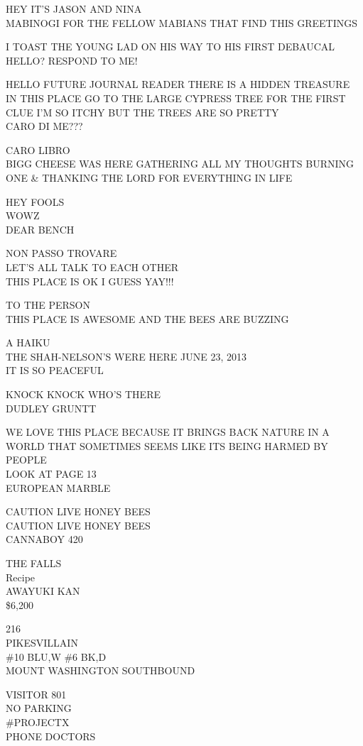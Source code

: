 \documentclass[10pt,letterpaper]{article}
\begin{document}
HEY IT'S JASON AND NINA\\
MABINOGI FOR THE FELLOW MABIANS THAT FIND THIS GREETINGS

I TOAST THE YOUNG LAD ON HIS WAY TO HIS FIRST DEBAUCAL\\
HELLO?  RESPOND TO ME!

HELLO FUTURE JOURNAL READER THERE IS A HIDDEN TREASURE IN THIS PLACE GO TO THE LARGE CYPRESS TREE FOR THE FIRST CLUE I'M SO ITCHY BUT THE TREES ARE SO PRETTY\\
CARO DI ME???

CARO LIBRO\\
BIGG CHEESE WAS HERE GATHERING ALL MY THOUGHTS BURNING ONE \& THANKING THE LORD FOR EVERYTHING IN LIFE

HEY FOOLS\\
WOWZ\\
DEAR BENCH

NON PASSO TROVARE\\
LET'S ALL TALK TO EACH OTHER\\
THIS PLACE IS OK I GUESS YAY!!!

TO THE PERSON\\
THIS PLACE IS AWESOME AND THE BEES ARE BUZZING

A HAIKU\\
THE SHAH{-}NELSON'S WERE HERE JUNE 23, 2013\\
IT IS SO PEACEFUL

KNOCK KNOCK WHO'S THERE\\
DUDLEY GRUNTT

WE LOVE THIS PLACE BECAUSE IT BRINGS BACK NATURE IN A WORLD THAT SOMETIMES SEEMS LIKE ITS BEING HARMED BY PEOPLE\\
LOOK AT PAGE 13\\
EUROPEAN MARBLE

CAUTION LIVE HONEY BEES\\
CAUTION LIVE HONEY BEES\\
CANNABOY 420

THE FALLS\\
Recipe\\
AWAYUKI KAN\\
\$6,200

216\\
PIKESVILLAIN\\
\#10 BLU,W \#6 BK,D\\
MOUNT WASHINGTON SOUTHBOUND

VISITOR 801\\
NO PARKING\\
\#PROJECTX\\
PHONE DOCTORS
\end{document}
